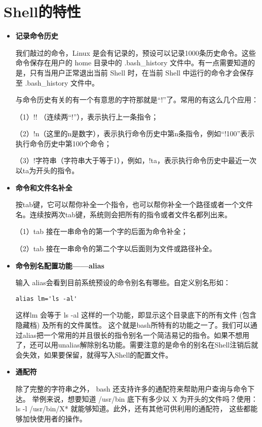\section{Shell的特性}
\begin{itemize}
\item \textbf{记录命令历史}

\qquad 我们敲过的命令，Linux 是会有记录的，预设可以记录1000条历史命令。这些命令保存在用户的 home 目录中的  .bash\_history 文件中。有一点需要知道的是，只有当用户正常退出当前 Shell 时，在当前 Shell 中运行的命令才会保存至  .bash\_history 文件中。

\qquad 与命令历史有关的有一个有意思的字符那就是``!''了。常用的有这么几个应用：

（1）!! （连续两``!''），表示执行上一条指令；

（2）!n（这里的n是数字），表示执行命令历史中第n条指令，例如``!100''表示执行命令历史中第100个命令；

（3）!字符串（字符串大于等于1），例如，!ta，表示执行命令历史中最近一次以ta为开头的指令。

\item \textbf{命令和文件名补全}

\qquad 按tab键，它可以帮你补全一个指令，也可以帮你补全一个路径或者一个文件名。连续按两次tab键，系统则会把所有的指令或者文件名都列出来。

（1）tab 接在一串命令的第一个字的后面为命令补全；

（2）tab 接在一串命令的第二个字以后面则为文件或路径补全。

\item \textbf{命令别名配置功能——alias}

\qquad 输入 alias会看到目前系统预设的命令别名有哪些。自定义别名形如：

\verb|alias lm='ls -al'|

这样lm 会等于 ls -al 这样的一个功能，即显示这个目录底下的所有文件 (包含隐藏档) 及所有的文件属性。
这个就是bash所特有的功能之一了。我们可以通过alias把一个常用的并且很长的指令别名一个简洁易记的指令。如果不想用了，还可以用unalias解除别名功能。需要注意的是命令的别名在Shell注销后就会失效，如果要保留，就得写入Shell的配置文件。

\item \textbf{通配符}

\qquad 除了完整的字符串之外， bash 还支持许多的通配符来帮助用户查询与命令下达。 举例来说，想要知道 /usr/bin 底下有多少以 X 为开头的文件吗？使用：ls -l /usr/bin/X* 就能够知道。此外，还有其他可供利用的通配符， 这些都能够加快使用者的操作。
\end{itemize}




